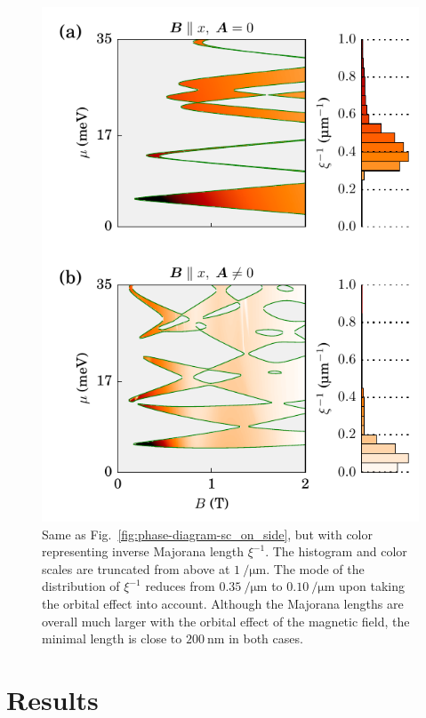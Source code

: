 \begin{figure}
\includegraphics[width=0.95\columnwidth]{figures/sc_on_side_length}
\caption{Same as Fig.~\ref{fig:phase-diagram-sc_on_side}, but with color representing inverse Majorana length $\xi^{-1}$.
The histogram and color scales are truncated from above at $\SI{1}{\per\micro\metre}$.
The mode of the distribution of $\xi^{-1}$ reduces from $\SI{0.35}{\per\micro\metre}$ to $\SI{0.10}{\per\micro\metre}$ upon taking the orbital effect into account.
Although the Majorana lengths are overall much larger with the orbital effect of the magnetic field, the minimal length is close to $\SI{200}{\nano\metre}$ in both cases.\label{fig:Majorana-length}}
\end{figure}

\section{Results}


